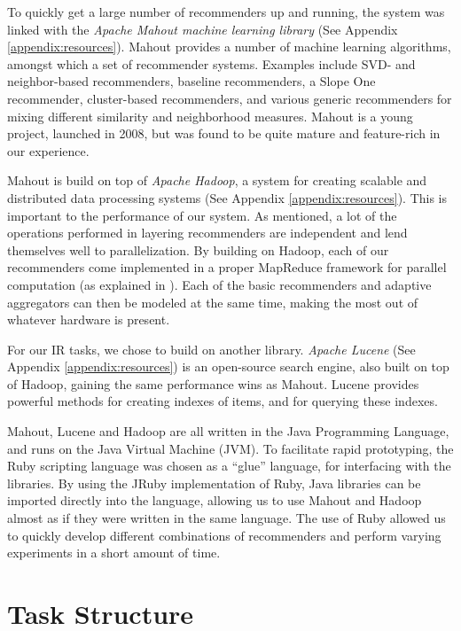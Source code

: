 To quickly get a large number of recommenders up and running,
the system was linked with the \emph{Apache Mahout machine learning library}
(See Appendix \ref{appendix:resources}). 
Mahout provides a number of machine learning
algorithms, amongst which a set of recommender systems.
Examples include SVD- and neighbor-based recommenders,
baseline recommenders, a Slope One recommender,
cluster-based recommenders,
and various generic recommenders for mixing different 
similarity and neighborhood measures.
Mahout is a young project, launched in 2008, 
but was found to be quite mature and feature-rich
in our experience.

Mahout is build on top of \emph{Apache Hadoop},
a system for creating scalable and distributed data processing systems 
(See Appendix \ref{appendix:resources}).
This is important to the performance of our system.
As mentioned, a lot of the operations performed in layering recommenders
are independent and lend themselves well to parallelization.
By building on Hadoop, each of our recommenders come implemented in a 
proper MapReduce framework for parallel computation (as explained in \citet[p75]{Manning2008}).
Each of the basic recommenders and adaptive aggregators can then be modeled at the same time,
making the most out of whatever hardware is present.

For our IR tasks, we chose to build on another library.
\emph{Apache Lucene} (See Appendix \ref{appendix:resources}) is an open-source search engine, also built on top of Hadoop,
gaining the same performance wins as Mahout.
Lucene provides powerful methods for creating indexes of items, and for querying these indexes.

Mahout, Lucene and Hadoop are all written in the Java Programming Language,
and runs on the Java Virtual Machine (JVM).
To facilitate rapid prototyping, the Ruby scripting language was chosen as a ``glue'' language,
for interfacing with the libraries. 
By using the JRuby implementation of Ruby, Java libraries can be imported directly
into the language, allowing us to use Mahout and Hadoop almost as if they were written in the same language.
The use of Ruby allowed us to quickly develop different combinations of recommenders and
perform varying experiments in a short amount of time.

\section{Task Structure}

